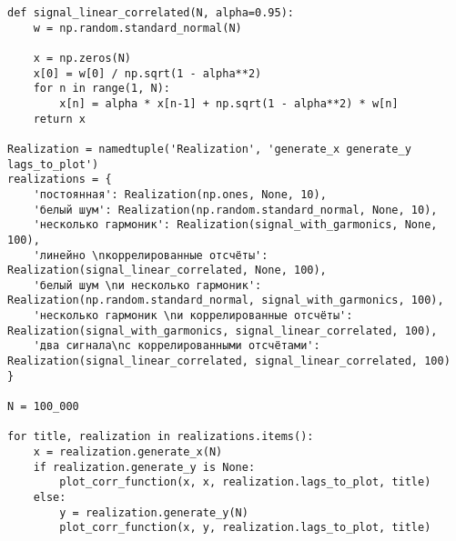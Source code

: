 {\begin{verbatim}
def signal_linear_correlated(N, alpha=0.95):
	w = np.random.standard_normal(N)

	x = np.zeros(N)
	x[0] = w[0] / np.sqrt(1 - alpha**2)
	for n in range(1, N):
		x[n] = alpha * x[n-1] + np.sqrt(1 - alpha**2) * w[n]
	return x
	
Realization = namedtuple('Realization', 'generate_x generate_y lags_to_plot')
realizations = {
	'постоянная': Realization(np.ones, None, 10),
	'белый шум': Realization(np.random.standard_normal, None, 10),
	'несколько гармоник': Realization(signal_with_garmonics, None, 100),
	'линейно \nкоррелированные отсчёты': Realization(signal_linear_correlated, None, 100),
	'белый шум \nи несколько гармоник': Realization(np.random.standard_normal, signal_with_garmonics, 100),
	'несколько гармоник \nи коррелированные отсчёты': Realization(signal_with_garmonics, signal_linear_correlated, 100),
	'два сигнала\nс коррелированными отсчётами': Realization(signal_linear_correlated, signal_linear_correlated, 100)
}

N = 100_000

for title, realization in realizations.items():
	x = realization.generate_x(N)
	if realization.generate_y is None:
		plot_corr_function(x, x, realization.lags_to_plot, title)
	else:
		y = realization.generate_y(N)
		plot_corr_function(x, y, realization.lags_to_plot, title)
	\end{verbatim}
}

